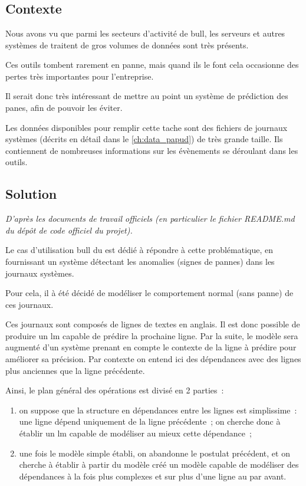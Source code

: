 \chapter{\label{ch:project_papud}}
\section{Contexte}
Nous avons vu que parmi les secteurs d'activité de \gls{bull}, les serveurs et autres systèmes de traitent de gros volumes de données sont très présents.

Ces outils tombent rarement en panne, mais quand ils le font cela occasionne des pertes très importantes pour l'entreprise.

Il serait donc très intéressant de mettre au point un système de prédiction des panes, afin de pouvoir les éviter.

Les données disponibles pour remplir cette tache sont des fichiers de journaux systèmes (décrits en détail dans le \autoref{ch:data_papud}) de très grande taille.
Ils contiennent de nombreuses informations sur les évènements se déroulant dans les outils.

\section{Solution}
\textit{D'après les documents de travail officiels (en particulier le fichier README.md du dépôt de code officiel du projet).} %

Le cas d'utilisation \gls{bull} du  est dédié à répondre à cette problématique, en fournissant un système détectant les anomalies (signes de pannes) dans les journaux systèmes.

Pour cela, il à été décidé de modéliser le comportement normal (sans panne) de ces journaux.

Ces journaux sont composés de lignes de textes en anglais. Il est donc possible de produire un \gls{lm} capable de prédire la prochaine ligne.
Par la suite, le modèle sera augmenté d'un système prenant en compte le contexte de la ligne à prédire pour améliorer sa précision.
Par contexte on entend ici des dépendances avec des lignes plus anciennes que la ligne précédente.

Ainsi, le plan général des opérations est divisé en 2 parties~:
\begin{enumerate}
	\item on suppose que la structure en dépendances entre les lignes est simplissime~: une ligne dépend uniquement de la ligne précédente~; on cherche donc à établir un \gls{lm} capable de modéliser au mieux cette dépendance~;
	\item une fois le modèle simple établi, on abandonne le postulat précédent, et on cherche à établir à partir du modèle créé un modèle capable de modéliser des dépendances à la fois plus complexes et sur plus d'une ligne au par avant.
\end{enumerate}
\hspace{1em}


